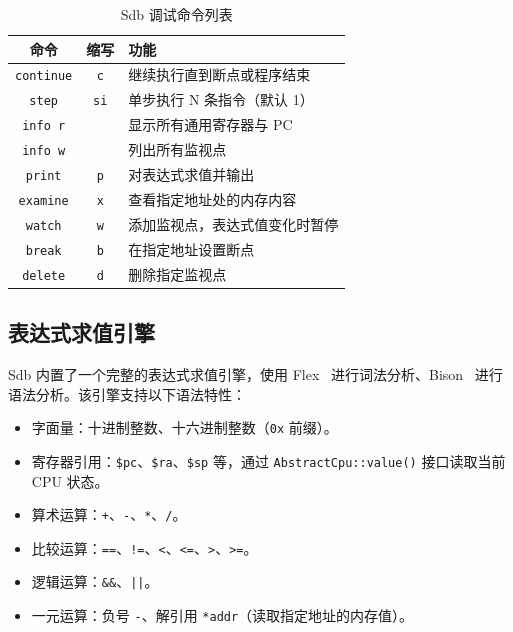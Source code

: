 \begin{table}[H]
  \centering
  \caption{Sdb 调试命令列表}
  \label{tbl:sdb-cmds}
  \begin{tabular}{ccl}
    \toprule
    命令 & 缩写 & 功能 \\
    \midrule
    \lstinline|continue| & \lstinline|c| & 继续执行直到断点或程序结束 \\
    \lstinline|step| & \lstinline|si| & 单步执行 N 条指令（默认 1） \\
    \lstinline|info r| & & 显示所有通用寄存器与 PC \\
    \lstinline|info w| & & 列出所有监视点 \\
    \lstinline|print| & \lstinline|p| & 对表达式求值并输出 \\
    \lstinline|examine| & \lstinline|x| & 查看指定地址处的内存内容 \\
    \lstinline|watch| & \lstinline|w| & 添加监视点，表达式值变化时暂停 \\
    \lstinline|break| & \lstinline|b| & 在指定地址设置断点 \\
    \lstinline|delete| & \lstinline|d| & 删除指定监视点 \\
    \bottomrule
  \end{tabular}
\end{table}

\subsection{表达式求值引擎}

Sdb 内置了一个完整的表达式求值引擎，使用 Flex~\cite{flex_manual} 进行词法分析、Bison~\cite{bison_manual} 进行语法分析。该引擎支持以下语法特性：

\begin{itemize}
  \item 字面量：十进制整数、十六进制整数（\lstinline|0x| 前缀）。
  \item 寄存器引用：\lstinline|$pc|、\lstinline|$ra|、\lstinline|$sp| 等，通过 \lstinline|AbstractCpu::value()| 接口读取当前 CPU 状态。
  \item 算术运算：\lstinline|+|、\lstinline|-|、\lstinline|*|、\lstinline|/|。
  \item 比较运算：\lstinline|==|、\lstinline|!=|、\lstinline|<|、\lstinline|<=|、\lstinline|>|、\lstinline|>=|。
  \item 逻辑运算：\lstinline!&&!、\lstinline!||!。
  \item 一元运算：负号 \lstinline|-|、解引用 \lstinline|*addr|（读取指定地址的内存值）。
\end{itemize}

